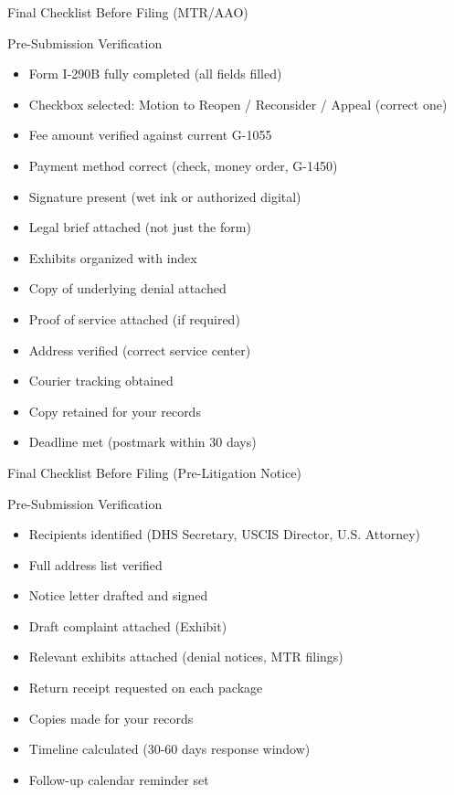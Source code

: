 \documentclass[11pt]{beamer}
\begin{document}
	\begin{frame}{Final Checklist Before Filing (MTR/AAO)}
		\scriptsize
		\begin{block}{Pre-Submission Verification}
			\begin{itemize}
				\item [$\square$] Form I-290B fully completed (all fields filled)
				\item [$\square$] Checkbox selected: Motion to Reopen / Reconsider / Appeal (correct one)
				\item [$\square$] Fee amount verified against current G-1055
				\item [$\square$] Payment method correct (check, money order, G-1450)
				\item [$\square$] Signature present (wet ink or authorized digital)
				\item [$\square$] Legal brief attached (not just the form)
				\item [$\square$] Exhibits organized with index
				\item [$\square$] Copy of underlying denial attached
				\item [$\square$] Proof of service attached (if required)
				\item [$\square$] Address verified (correct service center)
				\item [$\square$] Courier tracking obtained
				\item [$\square$] Copy retained for your records
				\item [$\square$] Deadline met (postmark within 30 days)
			\end{itemize}
		\end{block}
	\end{frame}
	
	\begin{frame}{Final Checklist Before Filing (Pre-Litigation Notice)}
		\scriptsize
		\begin{block}{Pre-Submission Verification}
			\begin{itemize}
				\item [$\square$] Recipients identified (DHS Secretary, USCIS Director, U.S. Attorney)
				\item [$\square$] Full address list verified
				\item [$\square$] Notice letter drafted and signed
				\item [$\square$] Draft complaint attached (Exhibit)
				\item [$\square$] Relevant exhibits attached (denial notices, MTR filings)
				\item [$\square$] Return receipt requested on each package
				\item [$\square$] Copies made for your records
				\item [$\square$] Timeline calculated (30-60 days response window)
				\item [$\square$] Follow-up calendar reminder set
			\end{itemize}
		\end{block}
	\end{frame}
	
\end{document}
